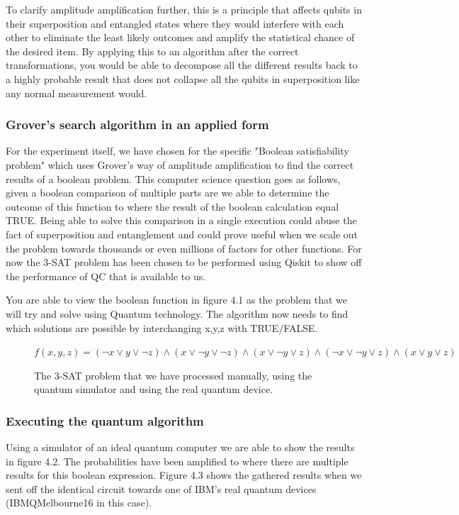 To clarify amplitude amplification further, this is a principle that affects qubits in their superposition and entangled states where they would interfere with each other to eliminate the least likely outcomes and amplify the statistical chance of the desired item. By applying this to an algorithm after the correct transformations, you would be able to decompose all the different results back to a highly probable result that does not collapse all the qubits in superposition like any normal measurement would. 

\subsubsection{Grover's search algorithm in an applied form}

For the experiment itself, we have chosen for the specific "Boolean satisfiability problem" which uses Grover's way of amplitude amplification to find the correct results of a boolean problem. This computer science question goes as follows, given a boolean comparison of multiple parts are we able to determine the outcome of this function to where the result of the boolean calculation equal TRUE. Being able to solve this comparison in a single execution could abuse the fact of superposition and entanglement and could prove useful when we scale out the problem towards thousands or even millions of factors for other functions. For now the 3-SAT problem has been chosen to be performed using Qiskit to show off the performance of QC that is available to us.

You are able to view the boolean function in figure 4.1 as the problem that we will try and solve using Quantum technology. The algorithm now needs to find which solutions are possible by interchanging x,y,z with TRUE/FALSE.

\begin{figure}
	$ f(x,y,z) = (\neg x \vee y \vee \neg z) \wedge  ( x \vee \neg y \vee \neg z) \wedge ( x \vee \neg y \vee  z) \wedge (\neg x \vee \neg y \vee z) \wedge  ( x \vee y \vee  z)	 $
	\caption{The 3-SAT problem that we have processed manually, using the quantum simulator and using the real quantum device.}
\end{figure}

				 
\subsubsection{Executing the quantum algorithm}				 

Using a simulator of an ideal quantum computer we are able to show the results in figure 4.2. The probabilities have been amplified to where there are multiple results for this boolean expression. Figure 4.3 shows the gathered results when we sent off the identical circuit towards one of IBM's real quantum devices (IBMQMelbourne16 in this case). 

